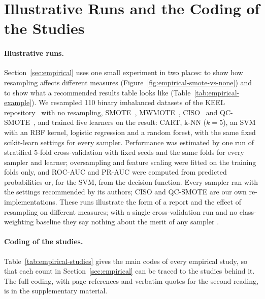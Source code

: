 \section{Illustrative Runs and the Coding of the Studies}
\label{sec:empirical-appendix}

\paragraph{Illustrative runs.} Section~\ref{sec:empirical} uses one small experiment in two places: to show how resampling affects different measures (Figure~\ref{fig:empirical-smote-vs-none}) and to show what a recommended results table looks like (Table~\ref{tab:empirical-example}). We resampled 110 binary imbalanced datasets of the KEEL repository~\parencite{alcalafdez2011keel} with no resampling, SMOTE~\parencite{chawla2002smote}, MWMOTE~\parencite{barua2014mwmote}, CISO~\parencite{yadav2025ciso} and QC-SMOTE~\parencite{upman2026qcsmote}, and trained five learners on the result: CART, k-NN ($k = 5$), an SVM with an RBF kernel, logistic regression and a random forest, with the same fixed scikit-learn settings for every sampler. Performance was estimated by one run of stratified 5-fold cross-validation with fixed seeds and the same folds for every sampler and learner; oversampling and feature scaling were fitted on the training folds only, and ROC-AUC and PR-AUC were computed from predicted probabilities or, for the SVM, from the decision function. Every sampler ran with the settings recommended by its authors; CISO and QC-SMOTE are our own re-implementations. These runs illustrate the form of a report and the effect of resampling on different measures; with a single cross-validation run and no class-weighting baseline they say nothing about the merit of any sampler .

\paragraph{Coding of the studies.} Table~\ref{tab:empirical-studies} gives the main codes of every empirical study, so that each count in Section~\ref{sec:empirical} can be traced to the studies behind it. The full coding, with page references and verbatim quotes for the second reading, is in the supplementary material.


